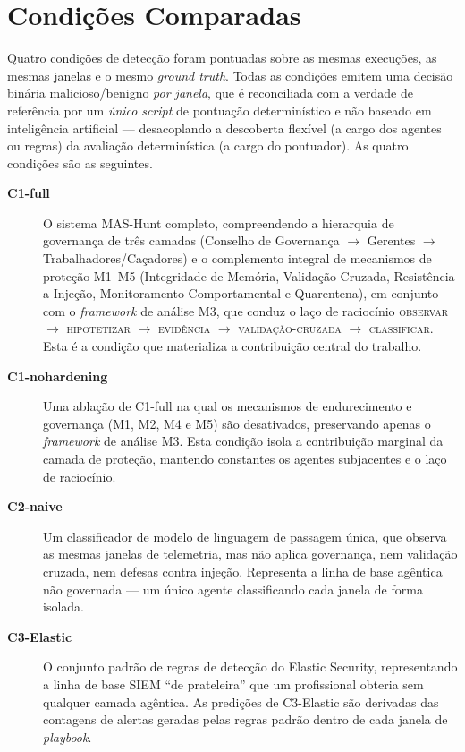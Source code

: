 \section{Condições Comparadas}
\label{sec:met-condicoes}

Quatro condições de detecção foram pontuadas sobre as mesmas execuções, as
mesmas janelas e o mesmo \textit{ground truth}. Todas as condições emitem uma
decisão binária malicioso/benigno \emph{por janela}, que é reconciliada com a
verdade de referência por um \emph{único} \textit{script} de pontuação
determinístico e não baseado em inteligência artificial --- desacoplando a
descoberta flexível (a cargo dos agentes ou regras) da avaliação determinística
(a cargo do pontuador). As quatro condições são as seguintes.

\begin{description}
    \item[\textbf{C1-full}] O sistema MAS-Hunt completo, compreendendo a
    hierarquia de governança de três camadas (Conselho de Governança $\rightarrow$
    Gerentes $\rightarrow$ Trabalhadores/Caçadores) e o complemento integral de
    mecanismos de proteção M1--M5 (Integridade de Memória, Validação Cruzada,
    Resistência a Injeção, Monitoramento Comportamental e Quarentena), em conjunto
    com o \textit{framework} de análise M3, que conduz o laço de raciocínio
    \textsc{observar} $\rightarrow$ \textsc{hipotetizar} $\rightarrow$
    \textsc{evidência} $\rightarrow$ \textsc{validação-cruzada} $\rightarrow$
    \textsc{classificar}. Esta é a condição que materializa a contribuição
    central do trabalho.
    \item[\textbf{C1-nohardening}] Uma ablação de C1-full na qual os mecanismos
    de endurecimento e governança (M1, M2, M4 e M5) são desativados, preservando
    apenas o \textit{framework} de análise M3. Esta condição isola a contribuição
    marginal da camada de proteção, mantendo constantes os agentes subjacentes e
    o laço de raciocínio.
    \item[\textbf{C2-naive}] Um classificador de modelo de linguagem de passagem
    única, que observa as mesmas janelas de telemetria, mas não aplica governança,
    nem validação cruzada, nem defesas contra injeção. Representa a linha de base
    agêntica não governada --- um único agente classificando cada janela de forma
    isolada.
    \item[\textbf{C3-Elastic}] O conjunto padrão de regras de detecção do Elastic
    Security, representando a linha de base SIEM ``de prateleira'' que um
    profissional obteria sem qualquer camada agêntica. As predições de C3-Elastic
    são derivadas das contagens de alertas geradas pelas regras padrão dentro de
    cada janela de \textit{playbook}.
\end{description}

